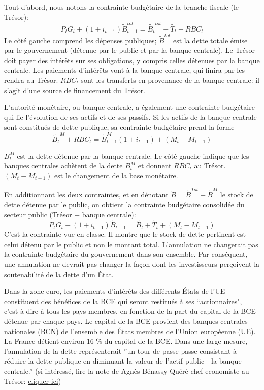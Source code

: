 \documentclass[a4paper,11pt]{article}
\begin{document}
Tout d'abord, nous notons la contrainte budgétaire de la branche fiscale (le Trésor): 
\[P_tG_t + (1 + i_{t-1}) \tilde{B}^{tot}_ {t-1} = \tilde{B_t }^ {tot} + \tilde {T _t} + RBC_t \]
Le côté gauche comprend les dépenses publiques; $ \tilde {B} ^ {tot} $ est la dette totale émise par le gouvernement (détenue par le public et par la banque centrale). Le Trésor doit payer des intérêts sur ses obligations, y compris celles détenues par la banque centrale. Les paiements d'intérêts vont \`{a} la banque centrale, qui finira par les  rendra au Trésor.   $ RBC_t $ 
sont les transferts en provenance de la banque centrale: il s'agit d'une source de financement du Tr\'{e}sor. 


L'autorité monétaire, ou banque centrale, a également une contrainte  budgétaire qui lie l'évolution de ses actifs et de ses passifs. Si les actifs de la banque centrale sont constitués de dette publique, sa contrainte budgétaire prend la forme
 \[\tilde{B_t}^M+RBC_t=\tilde{B}_{t-1}^M(1+i_{t-1}) + (M_t-M_{t-1})\]

$ B_t^ M $ est la dette détenue par la banque centrale. Le côté gauche indique que les banques centrales achètent de la dette $ B_t^M $ et donnent $ RBC_t $ au Trésor. $ (M_t-M_ {t-1}) $ est le changement de la base monétaire.

  
 

En additionnant les deux contraintes, et en 
dénotant $ \tilde {B} = \tilde {B}^ {Tot} - \tilde {B} ^ M $ le stock de dette  détenue par le public, on obtient la contrainte budg\'{e}taire  consolidée du secteur public (Tr\'{e}sor + banque centrale):  \[P_tG_t + (1 + i_ {t-1}) \tilde {B} _ {t-1} = \tilde {B_t} + \tilde {T} _t + (M_t-M_ {t-1}) \] C'est la contrainte vue en classe.  Il montre que le stock de dette pertinent est celui détenu par le public et non le montant total. L'annulation ne changerait pas la contrainte budgétaire du gouvernement dans son ensemble. Par conséquent, une annulation ne devrait pas changer la façon dont les investisseurs perçoivent la soutenabilité de la dette d'un État.

\bigskip


Dans la zone euro, les paiements d’intérêts des différents États de l’UE constituent des bénéfices de la BCE qui seront restitués à ses ``actionnaires", c’est-à-dire à tous les pays membres, en fonction de la part du capital de la BCE détenue par chaque pays. Le capital de la BCE provient des banques centrales nationales (BCN) de l’ensemble des États membres de l’Union européenne (UE). La France détient environ 16 \% du capital de la BCE. Dans une large mesure, l'annulation de la dette 
représenterait ''un tour de passe-passe consistant à réduire la dette publique en diminuant la valeur de l’actif public - la banque centrale.'' (si intéressé, lire la note de  Agnès Bénassy-Quéré chef economiste au Tr\'{e}sor: 
 \href{https://www.tresor.economie.gouv.fr/Articles/2020/11/30/annuler-la-dette-detenue-par-la-bce-est-ce-legal-utile-souhaitable}{\underline{cliquer ici}})
\end{document}

